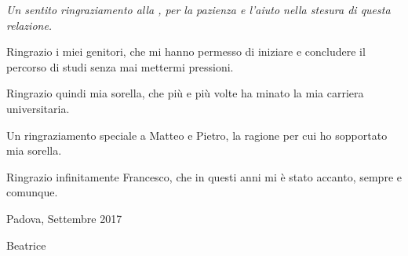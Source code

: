 
\begin{acknowledgements}
\vspace{0.5cm}
\itshape
Un sentito ringraziamento alla \supname, per la pazienza e l'aiuto nella stesura di questa relazione.

Ringrazio i miei genitori, che mi hanno permesso di iniziare e concludere il percorso di studi senza mai mettermi pressioni.

Ringrazio quindi mia sorella, che più e più volte ha minato la mia carriera universitaria.

Un ringraziamento speciale a Matteo e Pietro, la ragione per cui ho sopportato mia sorella.

Ringrazio infinitamente Francesco, che in questi anni mi è stato accanto, sempre e comunque.

\vspace{1cm}
\begin{minipage}[t]{0.49\textwidth}
	\begin{flushleft}
		Padova, Settembre 2017
	\end{flushleft}
\end{minipage}
%
\begin{minipage}[t]{0.49\textwidth}
	\begin{flushright}
		Beatrice
	\end{flushright}
\end{minipage}

\end{acknowledgements}
